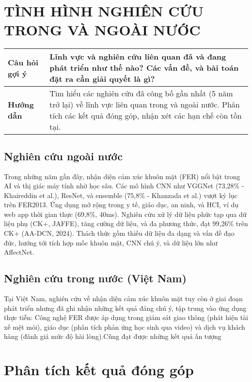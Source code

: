 \section*{TÌNH HÌNH NGHIÊN CỨU TRONG VÀ NGOÀI NƯỚC}

\begin{tabular}{|p{4cm}|p{11cm}|}
    \hline
    \textbf{Câu hỏi gợi ý} & Lĩnh vực và nghiên cứu liên quan đã và đang phát triển như thế nào? Các vấn đề, và bài toán đặt ra cần giải quyết là gì? \\
    \hline
    \textbf{Hướng dẫn} & Tìm hiểu các nghiên cứu đã công bố gần nhất (5 năm trở lại) về lĩnh vực liên quan trong và ngoài nước. Phân tích các kết quả đóng góp, nhận xét các hạn chế còn tồn tại. \\
    \hline
\end{tabular}
    
\medskip

\subsection*{Nghiên cứu ngoài nước}
Trong những năm gần đây, nhận diện cảm xúc khuôn mặt (FER) nổi bật trong AI và thị giác máy tính nhờ học sâu. Các mô hình CNN như VGGNet (73,28\% - Khaireddin et al.), ResNet, và ensemble (75,8\% - Khanzada et al.) vượt kỷ lục trên FER2013. Ứng dụng mở rộng trong y tế, giáo dục, an ninh, và HCI, ví dụ web app thời gian thực (69,8\%, 40ms). Nghiên cứu xử lý dữ liệu phức tạp qua dữ liệu phụ (CK+, JAFFE), tăng cường dữ liệu, và đa phương thức, đạt 99,26\% trên CK+ (AA-DCN, 2024). Thách thức gồm thiếu dữ liệu đa dạng và vấn đề đạo đức, hướng tới tích hợp mốc khuôn mặt, CNN chú ý, và dữ liệu lớn như AffectNet.

\subsection*{Nghiên cứu trong nước (Việt Nam)}
Tại Việt Nam, nghiên cứu về nhận diện cảm xúc khuôn mặt tuy còn ở giai đoạn phát triển nhưng đã ghi nhận những kết quả đáng chú ý, tập trung vào ứng dụng thực tiễn: Công nghệ FER được áp dụng trong giám sát giao thông (phát hiện tài xế mệt mỏi), giáo dục (phân tích phản ứng học sinh qua video) và dịch vụ khách hàng (đánh giá mức độ hài lòng).Cũng đạt được những kết quả ấn tượng 
\section*{Phân tích kết quả đóng góp}

